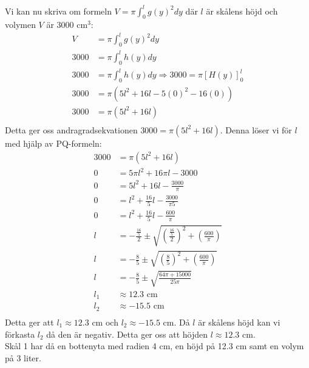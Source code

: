 \documentclass[12pt]{article}
\begin{document}
Vi kan nu skriva om formeln $V=\pi\int_{0}^{l}{g(y)}^2dy$ där $l$ är skålens höjd och volymen $V$ är $3000$ cm$^3$:
\begin{align*}
    V&=\pi\int_{0}^{l}{g(y)}^2dy\\
    3000&=\pi\int_{0}^{l}{h(y)}dy\\
    3000&=\pi\int_{0}^{l}{h(y)}dy\Rightarrow 3000=\pi{\left[{H(y)}\right]}_{0}^{l}\\
    3000&=\pi\left(5{l}^2+16l-5{(0)}^2-16(0)\right)\\
    3000&=\pi\left(5{l}^2+16l\right)\\
\end{align*}
Detta ger oss andragradsekvationen $3000=\pi\left(5{l}^2+16l\right)$. Denna löser vi för $l$ med hjälp av PQ-formeln:
\begin{align*}
    3000&=\pi\left(5{l}^2+16l\right)\\
    0&=5\pi{l}^2+16\pi{l}-3000\\
    0&=5{l}^2+16{l}-\frac{3000}{\pi}\\
    0&=l^2+\frac{16}{5}l-\frac{3000}{\pi5}\\
    0&=l^2+\frac{16}{5}l-\frac{600}{\pi}\\
    l&=-\frac{\frac{16}{5}}{2}\pm\sqrt{{\left(\frac{\frac{16}{5}}{2}\right)}^2+\left(\frac{600}{\pi}\right)}\\
    l&=-\frac{8}{5}\pm\sqrt{{\left(\frac{8}{5}\right)}^2+\left(\frac{600}{\pi}\right)}\\
    l&=-\frac{8}{5}\pm\sqrt{\frac{64\pi+15000}{25\pi}}\\
    l_1&\approx 12.3\text{ cm}\\
    l_2&\approx -15.5\text{ cm}\\
\end{align*}
Detta ger att $l_1\approx 12.3\text{ cm}$ och $l_2\approx -15.5\text{ cm}$.
Då $l$ är skålens höjd kan vi förkasta $l_2$ då den är negativ. Detta ger oss att höjden $l\approx 12.3\text{ cm}$.\\
Skål 1 har då en bottenyta med radien 4 cm, en höjd på 12.3 cm samt en volym på 3 liter.
\end{document}
